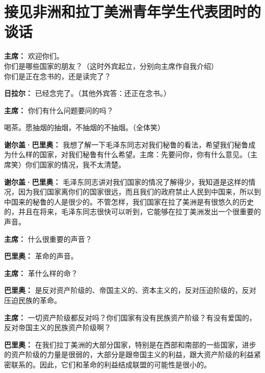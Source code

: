 \section[接见非洲和拉丁美洲青年学生代表团时的谈话（一九六四年八月二十五日）]{接见非洲和拉丁美洲青年学生代表团时的谈话}


\begin{duihua}

\item[\textbf{主席：}] 欢迎你们。\\
你们是哪些国家的朋友？（这时外宾起立，分别向主席作自我介绍）\\
你们是正在念书的，还是读完了？

\item[\textbf{日拉尔：}] 已经念完了。（其他外宾答：还正在念书。）

\item[\textbf{主席：}] 你们有什么问题要问的吗？

喝茶。愿抽烟的抽烟，不抽烟的不抽烟。（全体笑）

\item[\textbf{谢尔盖·巴里奥：}] 我想了解一下毛泽东同志对我们秘鲁的看法，希望我们秘鲁成为什么样的国家，对我们秘鲁有什么希望。主席：先要问你，你有什么意见。（主席笑）你们国家的情况，我不太清楚。

\item[\textbf{谢尔盖·巴里奥：}] 毛泽东同志讲对我们国家的情况了解得少，我知道是这样的情况，因为我们国家离你们的国家很远，而且我们的政府禁止人民到中国来，所以到中国来的秘鲁的人是很少的。不管怎样，我们国家在拉了美洲是有很悠久的历史的，并且在将来，毛泽东同志很快可以听到，它能够在拉丁美洲发出一个很重要的声音。

\item[\textbf{主席：}] 什么很重要的声音？

\item[\textbf{巴里奥：}] 革命的声音。

\item[\textbf{主席：}] 革什么样的命？

\item[\textbf{巴里奥：}] 是反对资产阶级的、帝国主义的、资本主义的，反对压迫阶级的，反对压迫民族的革命。

\item[\textbf{主席：}] 一切资产阶级都反对吗？你们国家有没有民族资产阶级？有没有爱国的，反对帝国主义的民族资产阶级啊？

\item[\textbf{巴里奥：}] 在我们拉丁美洲的大部分国家，特别是在西部和南部的一些国家，进步的资产阶级的力量是很弱的，大部分是跟帝国主义的利益，跟大资产阶级的利益紧密联系的。因此，它们和革命的利益结成联盟的可能性是很小的。


\end{duihua}
